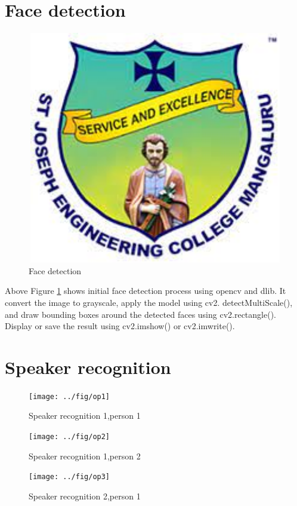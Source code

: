 \documentclass[12pt,a4paper]{report}
\begin{document}
\section{Face detection}
\begin{figure} [hbtp]
\centering
\includegraphics[width=5in,height=4in]{pic/sjeclogo.png}
\caption{Face detection}
\label{fig:pic5}
\end{figure}
\par Above Figure \ref{fig:pic5} shows initial face detection process using opencv and dlib. It convert the image to grayscale, apply the model using cv2. detectMultiScale(), and draw bounding boxes around the detected faces using cv2.rectangle(). Display or save the result using cv2.imshow() or cv2.imwrite().

\section{Speaker recognition}
\begin{figure} [hbtp]
\centering
\texttt{[image: ../fig/op1]}
\caption{Speaker recognition 1,person 1}
\end{figure}

\begin{figure} [hbtp]
\centering
\texttt{[image: ../fig/op2]}
\caption{Speaker recognition 1,person 2}
\end{figure}

\begin{figure} [hbtp]
\centering
\texttt{[image: ../fig/op3]}
\caption{Speaker recognition 2,person 1}
\end{figure}
\end{document}
